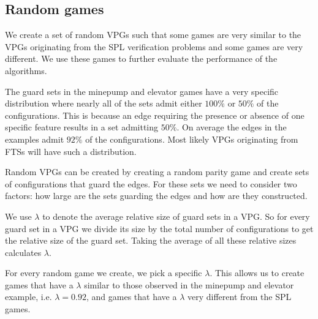 \subsection{Random games}
We create a set of random VPGs such that some games are very similar to the VPGs originating from the SPL verification problems and some games are very different. We use these games to further evaluate the performance of the algorithms.

The guard sets in the minepump and elevator games have a very specific distribution where nearly all of the sets admit either $100\%$ or $50\%$ of the configurations. This is because an edge requiring the presence or absence of one specific feature results in a set admitting $50\%$. On average the edges in the examples admit $92\%$ of the configurations. Most likely VPGs originating from FTSs will have such a distribution.

Random VPGs can be created by creating a random parity game and create sets of configurations that guard the edges. For these sets we need to consider two factors: how large are the sets guarding the edges and how are they constructed.

We use $\lambda$ to denote the average relative size of guard sets in a VPG. So for every guard set in a VPG we divide its size by the total number of configurations to get the relative size of the guard set. Taking the average of all these relative sizes calculates $\lambda$.

For every random game we create, we pick a specific $\lambda$. This allows us to create games that have a $\lambda$ similar to those observed in the minepump and elevator example, i.e. $\lambda = 0.92$, and games that have a $\lambda$ very different from the SPL games.

